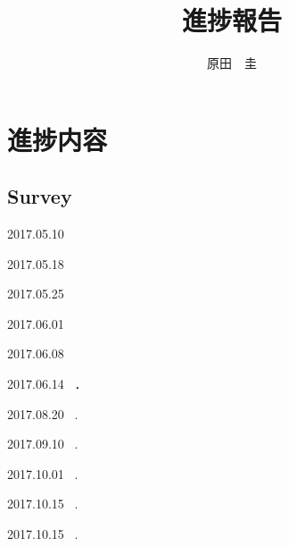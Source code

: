 \documentclass[twocolumn]{jarticle}
\title{進捗報告}
\author{原田　圭}
\begin{document}
\maketitle
\section{進捗内容}
\subsection{Survey}
2017.05.10 ~\cite{zhang2015assembler}

2017.05.18 ~\cite{cheng2016finding}

2017.05.25 ~\cite{koperski1996spatial}

2017.06.01 ~\cite{roddick1999bibliography}

2017.06.08 ~\cite{rao2012spatiotemporal}

2017.06.14 ~\cite{shekhar2015spatiotemporal}．

2017.08.20 ~\cite{daubechies1990wavelet}.

2017.09.10 ~\cite{keogh2001online}.

2017.10.01 ~\cite{zhang2014splitter}.

2017.10.15 ~\cite{matsubara2014autoplait}.

2017.10.15 ~\cite{matsubara2014funnel}.

\clearpage


\end{document}
